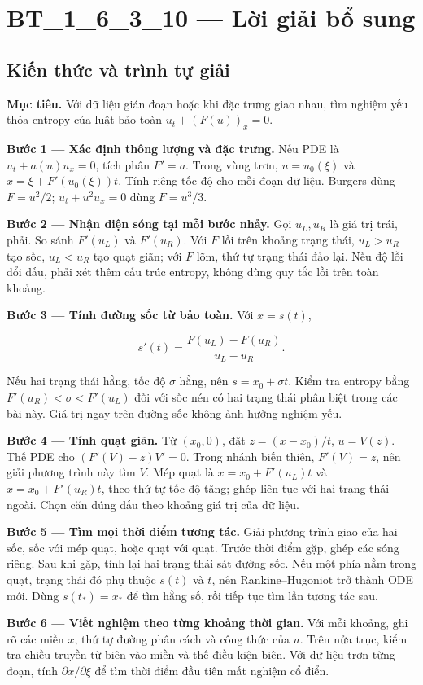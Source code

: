 \documentclass[10pt,a4paper]{article}
\begin{document}
\section*{BT\_1\_6\_3\_10 — Lời giải bổ sung}
\subsection*{Kiến thức và trình tự giải}
\textbf{Mục tiêu.} Với dữ liệu gián đoạn hoặc khi đặc trưng giao nhau, tìm nghiệm yếu thỏa entropy của luật bảo toàn $u_t+(F(u))_x=0$.

\textbf{Bước 1 — Xác định thông lượng và đặc trưng.} Nếu PDE là $u_t+a(u)u_x=0$, tích phân $F'=a$. Trong vùng trơn, $u=u_0(\xi)$ và $x=\xi+F'(u_0(\xi))t$. Tính riêng tốc độ cho mỗi đoạn dữ liệu. Burgers dùng $F=u^2/2$; $u_t+u^2u_x=0$ dùng $F=u^3/3$.

\textbf{Bước 2 — Nhận diện sóng tại mỗi bước nhảy.} Gọi $u_L,u_R$ là giá trị trái, phải. So sánh $F'(u_L)$ và $F'(u_R)$. Với $F$ lồi trên khoảng trạng thái, $u_L>u_R$ tạo sốc, $u_L<u_R$ tạo quạt giãn; với $F$ lõm, thứ tự trạng thái đảo lại. Nếu độ lồi đổi dấu, phải xét thêm cấu trúc entropy, không dùng quy tắc lồi trên toàn khoảng.

\textbf{Bước 3 — Tính đường sốc từ bảo toàn.} Với $x=s(t)$,

\[
s'(t)=\frac{F(u_L)-F(u_R)}{u_L-u_R}.
\]

Nếu hai trạng thái hằng, tốc độ $\sigma$ hằng, nên $s=x_0+\sigma t$. Kiểm tra entropy bằng $F'(u_R)<\sigma<F'(u_L)$ đối với sốc nén có hai trạng thái phân biệt trong các bài này. Giá trị ngay trên đường sốc không ảnh hưởng nghiệm yếu.

\textbf{Bước 4 — Tính quạt giãn.} Từ $(x_0,0)$, đặt $z=(x-x_0)/t$, $u=V(z)$. Thế PDE cho $(F'(V)-z)V'=0$. Trong nhánh biến thiên, $F'(V)=z$, nên giải phương trình này tìm $V$. Mép quạt là $x=x_0+F'(u_L)t$ và $x=x_0+F'(u_R)t$, theo thứ tự tốc độ tăng; ghép liên tục với hai trạng thái ngoài. Chọn căn đúng dấu theo khoảng giá trị của dữ liệu.

\textbf{Bước 5 — Tìm mọi thời điểm tương tác.} Giải phương trình giao của hai sốc, sốc với mép quạt, hoặc quạt với quạt. Trước thời điểm gặp, ghép các sóng riêng. Sau khi gặp, tính lại hai trạng thái sát đường sốc. Nếu một phía nằm trong quạt, trạng thái đó phụ thuộc $s(t)$ và $t$, nên Rankine–Hugoniot trở thành ODE mới. Dùng $s(t_*)=x_*$ để tìm hằng số, rồi tiếp tục tìm lần tương tác sau.

\textbf{Bước 6 — Viết nghiệm theo từng khoảng thời gian.} Với mỗi khoảng, ghi rõ các miền $x$, thứ tự đường phân cách và công thức của $u$. Trên nửa trục, kiểm tra chiều truyền từ biên vào miền và thế điều kiện biên. Với dữ liệu trơn từng đoạn, tính $\partial x/\partial\xi$ để tìm thời điểm đầu tiên mất nghiệm cổ điển.
\end{document}
